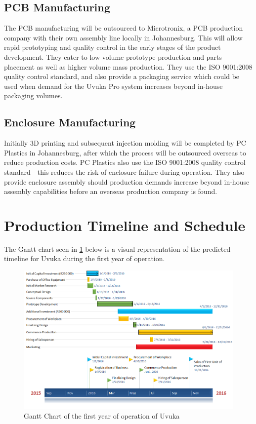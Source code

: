 \newpage
\subsection{PCB Manufacturing}
The PCB manufacturing will be outsourced to Microtronix, a PCB production company with their own assembly line locally in Johannesburg. This will allow rapid prototyping and quality control in the early stages of the product development. They cater to low-volume prototype production and parts placement as well as higher volume mass production. They use the ISO 9001:2008 quality control standard, and also provide a packaging service which could be used when demand for the Uvuka Pro system increases beyond in-house packaging volumes.

\subsection{Enclosure Manufacturing}
Initially 3D printing and subsequent injection molding will be completed by PC Plastics in Johannesburg, after which the process will be outsourced overseas to reduce production costs. PC Plastics also use the ISO 9001:2008 quality control standard - this reduces the risk of enclosure failure during operation. They also provide enclosure assembly should production demands increase beyond in-house assembly capabilities before an overseas production company is found. 


\section{Production Timeline and Schedule}
The Gantt chart seen in  \cref{fig:Gantt Chart 1} below is a visual representation of the predicted timeline for Uvuka during the first year of operation. 
\begin{figure}[H]
\centering
\includegraphics[width=1\textwidth]{Gantt.PNG}
\vskip10pt
\caption[Gantt Chart of the first year of operation of Uvuka]{Gantt Chart of the first year of operation of Uvuka}
\label{fig:Gantt Chart 1}
\end{figure}


